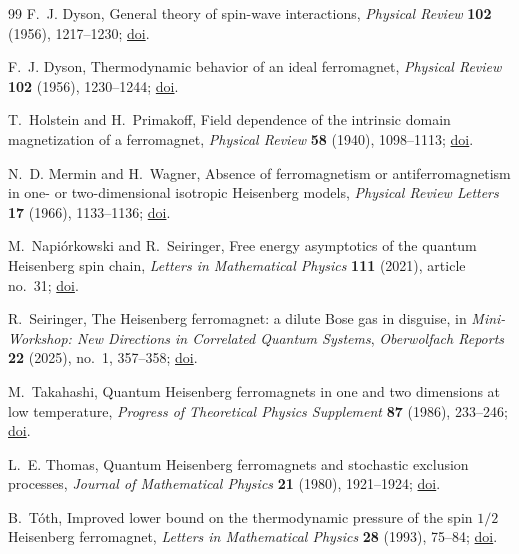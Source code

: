 \documentclass[11pt]{article}
\numberwithin{equation}{section}
\theoremstyle{remark}
\newcommand{\1}{\mathbf 1}
\begin{document}
\begin{thebibliography}{99}
F.~J. Dyson,
\newblock General theory of spin-wave interactions,
\newblock \emph{Physical Review} \textbf{102} (1956), 1217--1230;
\newblock \href{https://doi.org/10.1103/PhysRev.102.1217}{doi}.

F.~J. Dyson,
\newblock Thermodynamic behavior of an ideal ferromagnet,
\newblock \emph{Physical Review} \textbf{102} (1956), 1230--1244;
\newblock \href{https://doi.org/10.1103/PhysRev.102.1230}{doi}.

T.~Holstein and H.~Primakoff,
\newblock Field dependence of the intrinsic domain magnetization of a
ferromagnet,
\newblock \emph{Physical Review} \textbf{58} (1940), 1098--1113;
\newblock \href{https://doi.org/10.1103/PhysRev.58.1098}{doi}.

N.~D. Mermin and H.~Wagner,
\newblock Absence of ferromagnetism or antiferromagnetism in one- or
two-dimensional isotropic Heisenberg models,
\newblock \emph{Physical Review Letters} \textbf{17} (1966), 1133--1136;
\newblock \href{https://doi.org/10.1103/PhysRevLett.17.1133}{doi}.

M.~Napi\'orkowski and R.~Seiringer,
\newblock Free energy asymptotics of the quantum Heisenberg spin chain,
\newblock \emph{Letters in Mathematical Physics} \textbf{111} (2021),
article no.~31;
\newblock \href{https://doi.org/10.1007/s11005-021-01375-4}{doi}.

R.~Seiringer,
\newblock The Heisenberg ferromagnet: a dilute Bose gas in disguise,
\newblock in \emph{Mini-Workshop: New Directions in Correlated Quantum
Systems},
\newblock \emph{Oberwolfach Reports} \textbf{22} (2025), no.~1,
357--358;
\newblock
\href{https://doi.org/10.4171/OWR/2025/7}{doi}.

M.~Takahashi,
\newblock Quantum Heisenberg ferromagnets in one and two dimensions at low
temperature,
\newblock \emph{Progress of Theoretical Physics Supplement} \textbf{87}
(1986), 233--246;
\newblock \href{https://doi.org/10.1143/PTPS.87.233}{doi}.

L.~E. Thomas,
\newblock Quantum Heisenberg ferromagnets and stochastic exclusion
processes,
\newblock \emph{Journal of Mathematical Physics} \textbf{21} (1980),
1921--1924;
\newblock \href{https://doi.org/10.1063/1.524610}{doi}.

B.~T\'oth,
\newblock Improved lower bound on the thermodynamic pressure of the spin
\(1/2\) Heisenberg ferromagnet,
\newblock \emph{Letters in Mathematical Physics} \textbf{28} (1993),
75--84;
\newblock \href{https://doi.org/10.1007/BF00739568}{doi}.

\end{thebibliography}
\end{document}
